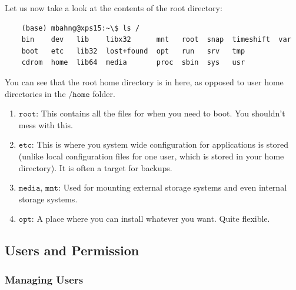 \documentclass{article}
\begin{document}
    Let us now take a look at the contents of the root directory: 
    \begin{lstlisting}
    (base) mbahng@xps15:~\$ ls /
    bin    dev   lib    libx32      mnt   root  snap  timeshift  var
    boot   etc   lib32  lost+found  opt   run   srv   tmp
    cdrom  home  lib64  media       proc  sbin  sys   usr
    \end{lstlisting}
    You can see that the root home directory is in here, as opposed to user home directories in the $\texttt{/home}$ folder. 
    \begin{enumerate}
        \item $\texttt{root}$: This contains all the files for when you need to boot. You shouldn't mess with this. 
        \item $\texttt{etc}$: This is where you system wide configuration for applications is stored (unlike local configuration files for one user, which is stored in your home directory). It is often a target for backups. 
        \item $\texttt{media}$, $\texttt{mnt}$: Used for mounting external storage systems and even internal storage systems. 
        \item $\texttt{opt}$: A place where you can install whatever you want. Quite flexible. 
    \end{enumerate}

  \subsection{Users and Permission}

    \subsubsection{Managing Users}
\end{document}
